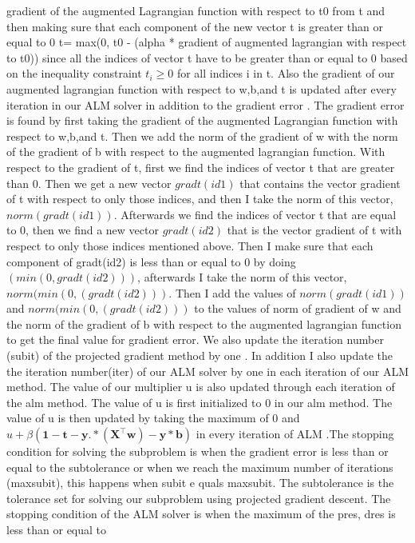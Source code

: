 \documentclass[11pt]{article}
\begin{document}
gradient of the augmented Lagrangian function with respect to t0 from t and then making sure that
each component of the new vector t is greater than or equal to 0 t= max(0, t0 - 
(alpha * gradient of augmented lagrangian with respect to t0)) since all the indices of vector t have to 
be 
greater than or equal to 0 based on the inequality constraint $t_{i}\geq0$ for all indices i in t. Also 
the 
gradient of our augmented lagrangian function with respect to w,b,and t is updated after every iteration 
in our ALM solver in
addition to the gradient error . The gradient error is found by first 
taking the gradient of the augmented Lagrangian function with respect to w,b,and t. Then we add the norm 
of the gradient of w with the norm of the gradient of b with respect to the augmented lagrangian 
function. With respect to the gradient of t, first we find the indices of vector t that are greater than 
0. 
Then we get a new vector $gradt(id1)$ that contains the vector gradient of t with respect to only those 
indices,  and then I take the norm of this vector,$norm(gradt(id1))$. Afterwards we find the indices of 
vector t that are equal to 0, then we find a 
new vector 
$gradt(id2)$ that is the vector gradient of t with respect to only those indices mentioned above.  Then 
I 
make sure that each component of gradt(id2) is less than or equal to 0 by doing $(min(0,gradt(id2)))$, 
afterwards 
I 
take the norm of this vector, $norm(min(0,(gradt(id2)))$. Then I add the values of $norm(gradt(id1))$ 
and 
$norm(min(0,(gradt(id2)))$ to the values of norm of gradient of w and the norm of the gradient of b with 
respect to the augmented lagrangian 
function to get the final value for 
gradient error.
We 
also 
update the iteration number (subit) of the projected gradient method by one . In addition I also update 
the 
the iteration number(iter) of our ALM solver by 
one in each iteration of our ALM method. The value of our multiplier u is also updated through each 
iteration of the alm method. The value of u is first initialized to 0 in our alm method. The value of u 
is then 
updated by taking the maximum of 0  and $u+ \beta\left(\mathbf{1-t -y .* \left({X}^\intercal
\mathbf{w}\right)-y*b}\right)$ in every iteration of ALM .The 
stopping condition for solving the subproblem is when the gradient error is less than or equal to the 
subtolerance or when we reach the maximum number of iterations (maxsubit), this happens when subit e
quals
maxsubit. The subtolerance is the tolerance set for 
solving our subproblem using 
projected gradient descent.
The stopping condition of the ALM solver is when the maximum of the pres, dres is less than or equal to 
\end{document}

